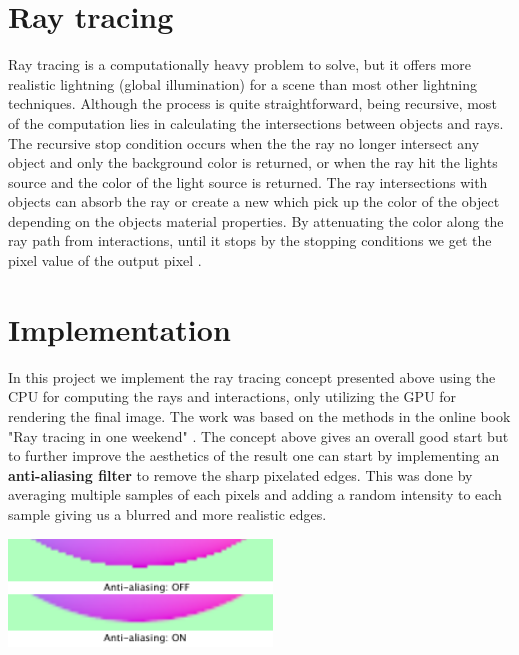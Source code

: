 \documentclass[a4paper]{article}
\begin{document}
\begin{multicols}{2}
\section*{Ray tracing}\vspace{-2mm}
Ray tracing is a computationally heavy problem to solve, but it offers more realistic lightning (global illumination) for a scene than most other lightning techniques. Although the process is quite straightforward, being recursive, most of the computation lies in calculating the intersections between objects and rays. The recursive stop condition occurs when the the ray no longer intersect any object and only the background color is returned, or when the ray hit the lights source and the color of the light source is returned. The ray intersections with objects can absorb the ray or create a new which pick up the color of the object depending on the objects material properties. By attenuating the color along the ray path from interactions, until it stops by the stopping conditions we get the pixel value of the output pixel \cite{cgbook}.

\vspace{-4mm}\section*{Implementation}\vspace{-2mm}
In this project we implement the ray tracing concept presented above using the CPU for computing the rays and interactions, only utilizing the GPU for rendering the final image. The work was based on the methods in the online book "Ray tracing in one weekend" \cite{Shirley}. The concept above gives an overall good start but to further improve the aesthetics of the result one can start by implementing an \textbf{anti-aliasing filter} to remove the sharp pixelated edges. This was done by averaging multiple samples of each pixels and adding a random intensity to each sample giving us a blurred and more realistic edges. 

\begin{center}
\includegraphics[width= 70mm]{figures/aliasing.pdf}
\end{center}


\end{multicols}
\end{document}
